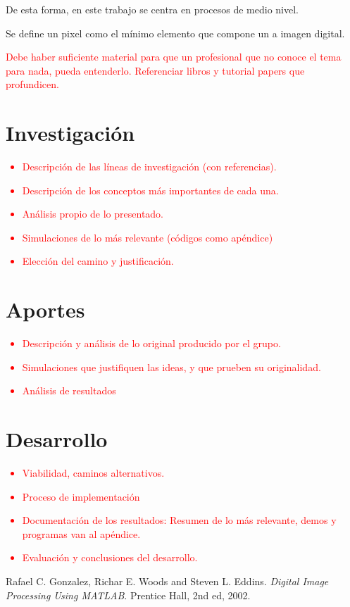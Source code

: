 	De esta forma, en este trabajo se centra en procesos de medio nivel.
		
	Se define un pixel como el mínimo elemento que compone un a imagen digital.

	\textcolor{red}{Debe haber suficiente material para que un profesional que no conoce el tema para nada, pueda entenderlo. Referenciar libros y tutorial papers que profundicen.}
	
\section{Investigación}
\textcolor{red}{
\begin{itemize}
	\item Descripción de las líneas de investigación (con referencias).
	\item Descripción de los conceptos más importantes de cada una.
	\item Análisis propio de lo presentado.
	\item Simulaciones de lo más relevante (códigos como apéndice)
	\item Elección del camino y justificación.
\end{itemize}
}

\section{Aportes}
\textcolor{red}{
\begin{itemize}
	\item Descripción y análisis de lo original producido por el grupo.
	\item Simulaciones que justifiquen las ideas, y que prueben su originalidad.
	\item Análisis de resultados
\end{itemize}
}

\section{Desarrollo}
\textcolor{red}{
\begin{itemize}
	\item Viabilidad, caminos alternativos.
	\item Proceso de implementación
	\item Documentación de los resultados: Resumen de lo más relevante, demos y programas van al apéndice.
	\item Evaluación y conclusiones del desarrollo.
\end{itemize}
}

\begin{thebibliography}{9}
Rafael C. Gonzalez, Richar E. Woods and Steven L. Eddins. \textit{Digital Image Processing Using MATLAB}. Prentice Hall, 2nd ed, 2002.
\end{thebibliography}

